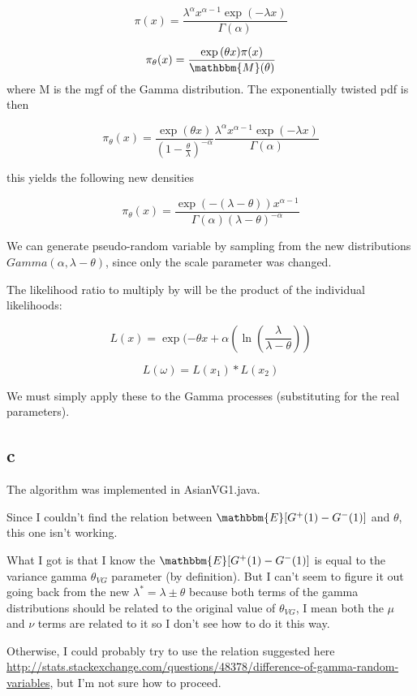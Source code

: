 \documentclass[12pt]{report}
\begin{document}
$$
\pi(x) = \dfrac{\lambda^\alpha x^{\alpha -1} \exp{(- \lambda x)}}{\Gamma(\alpha)}
$$

$$
\pi_{\theta}(x) = \dfrac{\exp{(\theta x)} \pi(x)}{\mathbbm{M}(\theta)}
$$
where M is the mgf of the Gamma distribution. The exponentially twisted pdf is then

$$
\pi_{\theta}(x) =
\dfrac{\exp(\theta x)}{(1 - \frac{\theta}{\lambda})^{-\alpha}}
\dfrac{\lambda^\alpha x^{\alpha -1} \exp(- \lambda x)}{\Gamma(\alpha)}
$$

this yields the following new densities

$$
\pi_{\theta}(x) = \dfrac{\exp(- (\lambda - \theta)) x^{\alpha - 1}}{\Gamma(\alpha) (\lambda - \theta)^{-\alpha}}
$$

We can generate pseudo-random variable by sampling from the new distributions $Gamma(\alpha, \lambda - \theta)$, since only the scale parameter was changed. 

\vspace{1 cm}
The likelihood ratio to multiply by will be the product of the individual likelihoods:

$$
L(x) = \exp( -\theta x + \alpha(\ln(\frac{\lambda}{\lambda - \theta}))
$$

$$
	L(\omega) = L(x_1) * L(x_2) 
$$

We must simply apply these to the Gamma processes (substituting for the real parameters).



\subsection*{c}

The algorithm was implemented in AsianVG1.java.

Since I couldn't find the relation between $\mathbbm{E}[G^+(1) - G^-(1)]$ and $\theta$, this one isn't working.

What I got is that I know the $\mathbbm{E}[G^+(1) - G^-(1)]$ is equal to the variance gamma $\theta_{VG}$ parameter (by definition). But I can't seem to figure it out going back from the new $\lambda^* = \lambda \pm \theta$ because both terms of the gamma distributions should be related to the original value of $\theta_{VG}$, I mean both the $\mu$ and $\nu$ terms are related to it so I don't see how to do it this way.

Otherwise, I could probably try to use the relation suggested here \url{http://stats.stackexchange.com/questions/48378/difference-of-gamma-random-variables}, but I'm not sure how to proceed.
\end{document}
